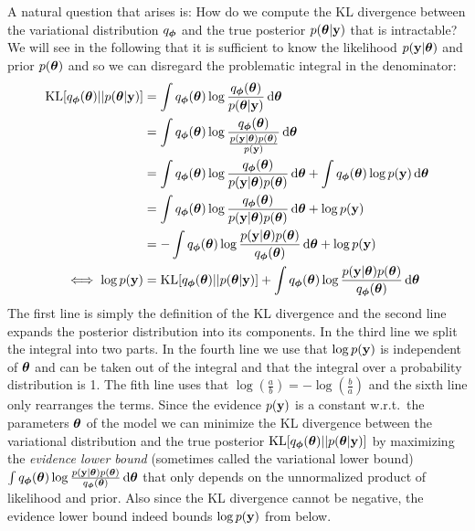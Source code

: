 \documentclass[../thesis.tex]{subfiles}
\begin{document}
A natural question that arises is: How do we compute the KL divergence between the variational distribution $q_{\boldsymbol{\mathbf{\phi}}}$ and the true posterior $p(\boldsymbol{\mathbf{\theta}} | \boldsymbol{\mathbf{y}})$ that is intractable? We will see in the following that it is sufficient to know the likelihood $p(\boldsymbol{\mathbf{y}} | \boldsymbol{\mathbf{\theta}})$ and prior $p(\boldsymbol{\mathbf{\theta}})$ and so we can disregard the problematic integral in the denominator:
\begin{equation}
    \begin{split}
        \operatorname{KL}[q_{\boldsymbol{\mathbf{\phi}}}(\boldsymbol{\mathbf{\theta}})||p(\boldsymbol{\mathbf{\theta}} | \boldsymbol{\mathbf{y}})] &= \int q_{\boldsymbol{\mathbf{\phi}}}(\boldsymbol{\mathbf{\theta}}) \log \frac{q_{\boldsymbol{\mathbf{\phi}}}(\boldsymbol{\mathbf{\theta}})} {p(\boldsymbol{\mathbf{\theta}} | \boldsymbol{\mathbf{y}})} \mathop{}\!\mathrm{d} \boldsymbol{\mathbf{\theta}} \\
        &= \int q_{\boldsymbol{\mathbf{\phi}}}(\boldsymbol{\mathbf{\theta}}) \log \frac{q_{\boldsymbol{\mathbf{\phi}}}(\boldsymbol{\mathbf{\theta}})}  {\frac{p(\boldsymbol{\mathbf{y}} | \boldsymbol{\mathbf{\theta}}) p(\boldsymbol{\mathbf{\theta}})} {p(\boldsymbol{\mathbf{y}})}} \mathop{}\!\mathrm{d} \boldsymbol{\mathbf{\theta}} \\
        &= \int q_{\boldsymbol{\mathbf{\phi}}}(\boldsymbol{\mathbf{\theta}}) \log \frac{q_{\boldsymbol{\mathbf{\phi}}}(\boldsymbol{\mathbf{\theta}})}{p(\boldsymbol{\mathbf{y}} | \boldsymbol{\mathbf{\theta}}) p(\boldsymbol{\mathbf{\theta}})} \mathop{}\!\mathrm{d} \boldsymbol{\mathbf{\theta}}  +  \int q_{\boldsymbol{\mathbf{\phi}}}(\boldsymbol{\mathbf{\theta}}) \log p(\boldsymbol{\mathbf{y}}) \mathop{}\!\mathrm{d} \boldsymbol{\mathbf{\theta}} \\
        &= \int q_{\boldsymbol{\mathbf{\phi}}}(\boldsymbol{\mathbf{\theta}}) \log \frac{q_{\boldsymbol{\mathbf{\phi}}}(\boldsymbol{\mathbf{\theta}})}{p(\boldsymbol{\mathbf{y}} | \boldsymbol{\mathbf{\theta}}) p(\boldsymbol{\mathbf{\theta}})} \mathop{}\!\mathrm{d} \boldsymbol{\mathbf{\theta}}  +  \log p(\boldsymbol{\mathbf{y}}) \\
        &= - \int q_{\boldsymbol{\mathbf{\phi}}}(\boldsymbol{\mathbf{\theta}}) \log \frac{p(\boldsymbol{\mathbf{y}} | \boldsymbol{\mathbf{\theta}}) p(\boldsymbol{\mathbf{\theta}})} {q_{\boldsymbol{\mathbf{\phi}}}(\boldsymbol{\mathbf{\theta}})} \mathop{}\!\mathrm{d} \boldsymbol{\mathbf{\theta}}  +  \log p(\boldsymbol{\mathbf{y}}) \\
    \iff \log p(\boldsymbol{\mathbf{y}}) &= \operatorname{KL}[q_{\boldsymbol{\mathbf{\phi}}}(\boldsymbol{\mathbf{\theta}})||p(\boldsymbol{\mathbf{\theta}} | \boldsymbol{\mathbf{y}})]  +  \int q_{\boldsymbol{\mathbf{\phi}}}(\boldsymbol{\mathbf{\theta}}) \log \frac{p(\boldsymbol{\mathbf{y}} | \boldsymbol{\mathbf{\theta}}) p(\boldsymbol{\mathbf{\theta}})} {q_{\boldsymbol{\mathbf{\phi}}}(\boldsymbol{\mathbf{\theta}})} \mathop{}\!\mathrm{d} \boldsymbol{\mathbf{\theta}}
    \end{split}
\end{equation}
The first line is simply the definition of the KL divergence and the second line expands the posterior distribution into its components. In the third line we split the integral into two parts. In the fourth line we use that $\log p(\boldsymbol{\mathbf{y}})$ is independent of $\boldsymbol{\mathbf{\theta}}$ and can be taken out of the integral and that the integral over a probability distribution is 1. The fith line uses that $\log(\frac{a}{b})=-\log(\frac{b}{a})$ and the sixth line only rearranges the terms.
Since the evidence $p(\boldsymbol{\mathbf{y}})$ is a constant w.r.t.\ the parameters $\boldsymbol{\mathbf{\theta}}$ of the model we can minimize the KL divergence between the variational distribution and the true posterior $\operatorname{KL}[q_{\boldsymbol{\mathbf{\phi}}}(\boldsymbol{\mathbf{\theta}})||p(\boldsymbol{\mathbf{\theta}} | \boldsymbol{\mathbf{y}})]$ by maximizing the \textit{evidence lower bound} (sometimes called the variational lower bound) $\int q_{\boldsymbol{\mathbf{\phi}}}(\boldsymbol{\mathbf{\theta}}) \log \frac{p(\boldsymbol{\mathbf{y}} | \boldsymbol{\mathbf{\theta}}) p(\boldsymbol{\mathbf{\theta}})} {q_{\boldsymbol{\mathbf{\phi}}}(\boldsymbol{\mathbf{\theta}})} \mathop{}\!\mathrm{d} \boldsymbol{\mathbf{\theta}}$ that only depends on the unnormalized product of likelihood and prior. Also since the KL divergence cannot be negative, the evidence lower bound indeed bounds $\log p(\boldsymbol{\mathbf{y}})$ from below.
\end{document}
